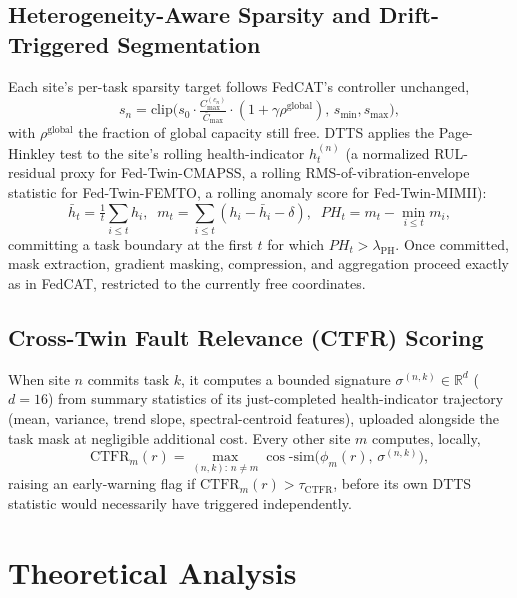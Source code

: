 \documentclass[journal]{IEEEtran}
\begin{document}
\subsection{Heterogeneity-Aware Sparsity and Drift-Triggered Segmentation}

Each site's per-task sparsity target follows FedCAT's controller unchanged,
\begin{equation}
s_n = \mathrm{clip}\Big(s_0 \cdot \tfrac{C_{\max}^{(c_n)}}{\bar C_{\max}} \cdot (1+\gamma \rho^{\text{global}}),\, s_{\min}, s_{\max}\Big),
\label{eq:sparsity}
\end{equation}
with $\rho^{\text{global}}$ the fraction of global capacity still free. DTTS applies the Page-Hinkley test \cite{page1954} to the site's rolling health-indicator $h_t^{(n)}$ (a normalized RUL-residual proxy for Fed-Twin-CMAPSS, a rolling RMS-of-vibration-envelope statistic for Fed-Twin-FEMTO, a rolling anomaly score for Fed-Twin-MIMII):
\begin{equation}
\bar h_t = \tfrac{1}{t}\textstyle\sum_{i\le t} h_i,\;\; m_t = \textstyle\sum_{i\le t}(h_i-\bar h_i-\delta),\;\; PH_t = m_t - \min_{i\le t} m_i,
\label{eq:ph}
\end{equation}
committing a task boundary at the first $t$ for which $PH_t > \lambda_{\text{PH}}$. Once committed, mask extraction, gradient masking, compression, and aggregation proceed exactly as in FedCAT, restricted to the currently free coordinates.

\subsection{Cross-Twin Fault Relevance (CTFR) Scoring}

When site $n$ commits task $k$, it computes a bounded signature $\sigma^{(n,k)} \in \mathbb{R}^d$ ($d=16$) from summary statistics of its just-completed health-indicator trajectory (mean, variance, trend slope, spectral-centroid features), uploaded alongside the task mask at negligible additional cost. Every other site $m$ computes, locally,
\begin{equation}
\mathrm{CTFR}_m(r) = \max_{(n,k):\,n\ne m} \cos\text{-sim}\big(\phi_m(r),\, \sigma^{(n,k)}\big),
\label{eq:ctfr}
\end{equation}
raising an early-warning flag if $\mathrm{CTFR}_m(r) > \tau_{\text{CTFR}}$, before its own DTTS statistic would necessarily have triggered independently.

\section{Theoretical Analysis}
\end{document}

